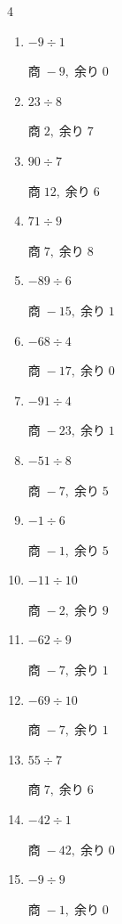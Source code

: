 \begin{multicols}{4}
\begin{enumerate}
  \item $-9 \div 1$

        $商\; -9,\; 余り\; 0$

  \item $23 \div 8$

        $商\; 2,\; 余り\; 7$

  \item $90 \div 7$

        $商\; 12,\; 余り\; 6$

  \item $71 \div 9$

        $商\; 7,\; 余り\; 8$

\columnbreak %

  \item $-89 \div 6$

        $商\; -15,\; 余り\; 1$

  \item $-68 \div 4$

        $商\; -17,\; 余り\; 0$

  \item $-91 \div 4$

        $商\; -23,\; 余り\; 1$

  \item $-51 \div 8$

        $商\; -7,\; 余り\; 5$

  \item $-1 \div 6$

        $商\; -1,\; 余り\; 5$

  \item $-11 \div 10$

        $商\; -2,\; 余り\; 9$

  \item $-62 \div 9$

        $商\; -7,\; 余り\; 1$

  \item $-69 \div 10$

        $商\; -7,\; 余り\; 1$

  \item $55 \div 7$

        $商\; 7,\; 余り\; 6$

  \item $-42 \div 1$

        $商\; -42,\; 余り\; 0$

  \item $-9 \div 9$

        $商\; -1,\; 余り\; 0$


\end{enumerate}
\end{multicols}
